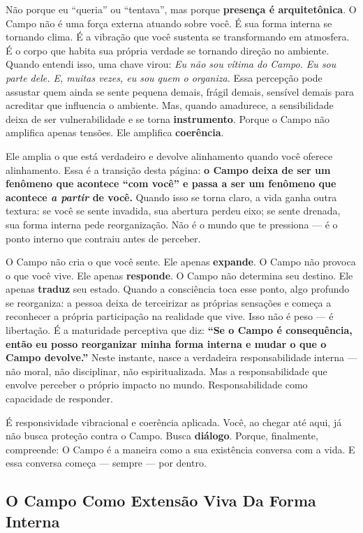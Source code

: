 \documentclass[12pt]{book}
\begin{document}
Não porque eu \enquote{queria} ou \enquote{tentava}, mas porque \textbf{presença é arquitetônica}. O Campo não é uma força externa atuando sobre você. É sua forma interna se tornando clima. É a vibração que você sustenta se transformando em atmosfera. É o corpo que habita sua própria verdade se tornando direção no ambiente. Quando entendi isso, uma chave virou: \textit{Eu não sou vítima do Campo. Eu sou parte dele. E, muitas vezes, eu sou quem o organiza.} Essa percepção pode assustar quem ainda se sente pequena demais, frágil demais, sensível demais para acreditar que influencia o ambiente. Mas, quando amadurece, a sensibilidade deixa de ser vulnerabilidade e se torna \textbf{instrumento}. Porque o Campo não amplifica apenas tensões. Ele amplifica \textbf{coerência}.

Ele amplia o que está verdadeiro e devolve alinhamento quando você oferece alinhamento. Essa é a transição desta página: \textbf{o Campo deixa de ser um fenômeno que acontece \enquote{com você} e passa a ser um fenômeno que acontece \textit{a partir} de você.} Quando isso se torna claro, a vida ganha outra textura: se você se sente invadida, sua abertura perdeu eixo; se sente drenada, sua forma interna pede reorganização. Não é o mundo que te pressiona --- é o ponto interno que contraiu antes de perceber.

O Campo não cria o que você sente. Ele apenas \textbf{expande}. O Campo não provoca o que você vive. Ele apenas \textbf{responde}. O Campo não determina seu destino. Ele apenas \textbf{traduz} seu estado. Quando a consciência toca esse ponto, algo profundo se reorganiza: a pessoa deixa de terceirizar as próprias sensações e começa a reconhecer a própria participação na realidade que vive. Isso não é peso --- é libertação. É a maturidade perceptiva que diz: \textbf{\enquote{Se o Campo é consequência, então eu posso reorganizar minha forma interna e mudar o que o Campo devolve.}} Neste instante, nasce a verdadeira responsabilidade interna --- não moral, não disciplinar, não espiritualizada. Mas a responsabilidade que envolve perceber o próprio impacto no mundo. Responsabilidade como capacidade de responder.

É responsividade vibracional e coerência aplicada. Você, ao chegar até aqui, já não busca proteção contra o Campo. Busca \textbf{diálogo}. Porque, finalmente, compreende: O Campo é a maneira como a sua existência conversa com a vida. E essa conversa começa --- sempre --- por dentro.

\subsection*{O Campo Como Extensão Viva Da Forma Interna}
\end{document}
